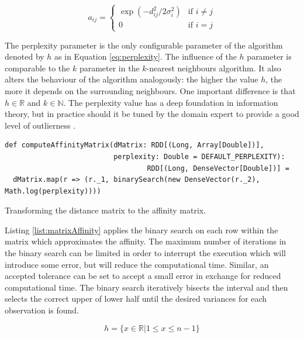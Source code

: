 \begin{equation}
a_{ij} = \begin{cases} \exp(-d_{ij}^{2} / 2 \sigma_{i}^{2}) & \text{if } i \neq j\\ 0 & \text{if } i = j \end{cases}
\label{eq:affinity}
\end{equation}

The perplexity parameter is the only configurable parameter of the algorithm denoted by $h$ as in Equation \ref{eq:perplexity}. The influence of the $h$ parameter is comparable to the $k$ parameter in the $k$-nearest neighbours algorithm. It also alters the behaviour of the algorithm analogously: the higher the value $h$, the more it depends on the surrounding neighbours. One important difference is that $h \in \mathbb{R}$ and $k \in \mathbb{N}$. The perplexity value has a deep foundation in information theory, but in practice should it be tuned by the domain expert to provide a good level of outlierness \cite{MSU:CSE:00:2}.

\begin{listing}[ht!]
\begin{verbatim}
def computeAffinityMatrix(dMatrix: RDD[(Long, Array[Double])], 
                          perplexity: Double = DEFAULT_PERPLEXITY): 
                                  RDD[(Long, DenseVector[Double])] = 
  dMatrix.map(r => (r._1, binarySearch(new DenseVector(r._2), Math.log(perplexity))))
\end{verbatim}
               
\caption{Transforming the distance matrix to the affinity matrix.}
\label{list:matrixAffinity}
\end{listing}

Listing \ref{list:matrixAffinity} applies the binary search on each row within the matrix which approximates the affinity. The maximum number of iterations in the binary search can be limited in order to interrupt the execution which will introduce some error, but will reduce the computational time. Similar, an accepted tolerance can be set to accept a small error in exchange for reduced computational time. The binary search iteratively bisects the interval and then selects the correct upper of lower half until the desired variances for each observation is found.

\begin{equation}
h = \{x \in \mathbb{R} | 1 \leq x \leq n-1\}
\label{eq:perplexity}
\end{equation}

